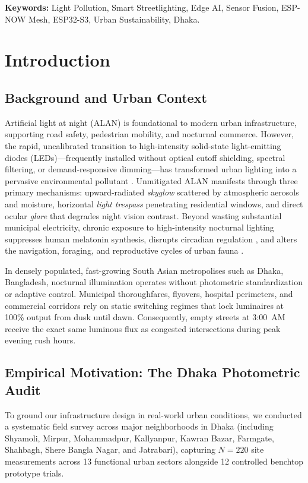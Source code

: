 \documentclass[11pt,a4paper]{article}
\begin{document}
\vspace{0.5em}
\noindent\textbf{Keywords:} Light Pollution, Smart Streetlighting, Edge AI, Sensor Fusion, ESP-NOW Mesh, ESP32-S3, Urban Sustainability, Dhaka.

\section{Introduction}

\subsection{Background and Urban Context}
Artificial light at night (ALAN) is foundational to modern urban infrastructure, supporting road safety, pedestrian mobility, and nocturnal commerce. However, the rapid, uncalibrated transition to high-intensity solid-state light-emitting diodes (LEDs)---frequently installed without optical cutoff shielding, spectral filtering, or demand-responsive dimming---has transformed urban lighting into a pervasive environmental pollutant \cite{falchi2016new,kyba2017artificially,sanchez2021first,darksky_ies2020}. Unmitigated ALAN manifests through three primary mechanisms: upward-radiated \textit{skyglow} scattered by atmospheric aerosols and moisture, horizontal \textit{light trespass} penetrating residential windows, and direct ocular \textit{glare} that degrades night vision contrast. Beyond wasting substantial municipal electricity, chronic exposure to high-intensity nocturnal lighting suppresses human melatonin synthesis, disrupts circadian regulation \cite{cho2015effects}, and alters the navigation, foraging, and reproductive cycles of urban fauna \cite{gaston2013ecological}.

In densely populated, fast-growing South Asian metropolises such as Dhaka, Bangladesh, nocturnal illumination operates without photometric standardization or adaptive control. Municipal thoroughfares, flyovers, hospital perimeters, and commercial corridors rely on static switching regimes that lock luminaires at 100\% output from dusk until dawn. Consequently, empty streets at 3:00~AM receive the exact same luminous flux as congested intersections during peak evening rush hours.

\subsection{Empirical Motivation: The Dhaka Photometric Audit}
To ground our infrastructure design in real-world urban conditions, we conducted a systematic field survey across major neighborhoods in Dhaka (including Shyamoli, Mirpur, Mohammadpur, Kallyanpur, Kawran Bazar, Farmgate, Shahbagh, Shere Bangla Nagar, and Jatrabari), capturing \(N = 220\) site measurements across 13 functional urban sectors alongside 12 controlled benchtop prototype trials. 
\end{document}

